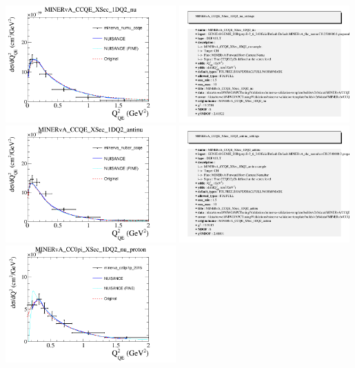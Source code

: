 \documentclass{article}
\begin{document}
\centering
\includegraphics[width=0.49\textwidth]{figures/minerva_numu_ccqe_comp.png}
\includegraphics[width=0.49\textwidth]{figures/minerva_numu_ccqe_info.png}
\centering
\includegraphics[width=0.49\textwidth]{figures/minerva_nubar_ccqe_comp.png}
\includegraphics[width=0.49\textwidth]{figures/minerva_nubar_ccqe_info.png}
\centering
\includegraphics[width=0.49\textwidth]{figures/minerva_cc0pi1p_2015_comp.png}
\end{document}
